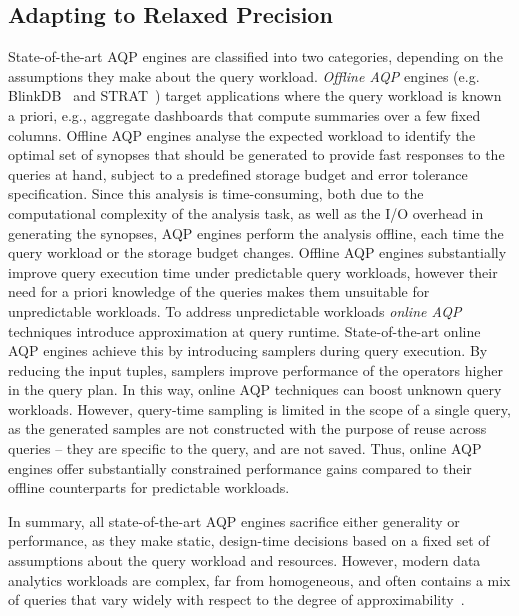 \subsection{Adapting to Relaxed Precision}

State-of-the-art AQP engines are classified into two categories,
depending on the assumptions they make about the query workload.
\emph{Offline AQP} engines (e.g. BlinkDB~\cite{Agarwal2013} and 
STRAT~\cite{Chaudhuri2001b}) target applications where the query 
workload is known a priori, e.g., aggregate dashboards that compute 
summaries over a few fixed columns. Offline AQP engines analyse the 
expected workload to identify the optimal set of synopses that should 
be generated to provide fast responses to the queries at hand, 
subject to a predefined storage budget and error tolerance 
specification. Since this analysis is time-consuming, both due to the 
computational complexity of the analysis task, as well as the I/O 
overhead in generating the synopses, AQP engines perform the analysis 
offline, each time the query workload or the storage budget changes.
Offline AQP engines substantially improve query execution time 
under predictable query workloads, however their need for a priori knowledge 
of the queries makes them unsuitable for unpredictable workloads. 
%
To address unpredictable workloads \emph{online AQP} techniques 
introduce approximation at query runtime. State-of-the-art online AQP 
engines achieve this by introducing samplers during query execution. 
By reducing the input tuples, samplers improve performance of the 
operators higher in the query plan. In this way, online AQP 
techniques can boost unknown query workloads. However, query-time 
sampling is limited in the scope of a single query, as the generated 
samples are not constructed with the purpose of reuse across queries 
-- they are specific to the query, and are not saved. Thus, online 
AQP engines offer substantially constrained performance gains 
compared to their offline counterparts for predictable workloads.

In summary, all state-of-the-art AQP engines sacrifice either 
generality or performance, as they make 
static, design-time decisions based on a fixed set of assumptions 
about the query workload and resources. 
However, modern data analytics workloads are complex, far 
from homogeneous, and often contains a mix of queries that vary 
widely with respect to the degree of 
approximability~\cite{Agarwal2013}. 

